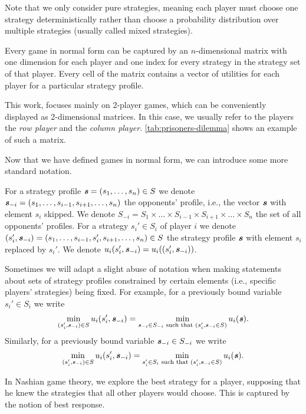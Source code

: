 Note that we only consider pure strategies, meaning each player must choose one strategy deterministically rather than choose a probability distribution over multiple strategies (usually called mixed strategies).

Every game in normal form can be captured by an $n$-dimensional matrix with one dimension for each player and one index for every strategy in the strategy set of that player.
Every cell of the matrix contains a vector of utilities for each player for a particular strategy profile.

This work, focuses mainly on 2-player games, which can be conveniently displayed as 2-dimensional matrices.
In this case, we usually refer to the players the \textit{row player} and the \textit{column player}.
\autoref{tab:prisoners-dilemma} shows an example of such a matrix.

Now that we have defined games in normal form, we can introduce some more standard notation.

\begin{definition}
  For a strategy profile $\boldsymbol{\mathit{s}} = (s_1, \dots, s_n) \in S$ we denote $\boldsymbol{\mathit{s}}_{-i} = (s_1, \dots, s_{i-1}, s_{i+1}, \dots, s_n)$ the opponents' profile, i.e., the vector $\boldsymbol{\mathit{s}}$ with element $s_i$ skipped.
  We denote $S_{-i} = S_1 \times \dots \times S_{i-1} \times S_{i+1} \times \dots \times S_n$ the set of all opponents' profiles.
  For a strategy $s_i' \in S_i$ of player $i$ we denote $(s_i', \boldsymbol{\mathit{s}}_{-i}) = (s_1, \dots, s_{i-1}, s_i', s_{i+1}, \dots, s_n) \in S$ the strategy profile $\boldsymbol{\mathit{s}}$ with element $s_i$ replaced by $s_i'$.
  We denote  $u_i(s_i', \boldsymbol{\mathit{s}}_{-i}) = u_i((s_i', \boldsymbol{\mathit{s}}_{-i}))$.
\end{definition}

Sometimes we will adapt a slight abuse of notation when making statements about sets of strategy profiles constrained by certain elements (i.e., specific players' strategies) being fixed.
For example, for a previously bound variable $s_i' \in S_i$ we write
\[
  \min_{(s_i', \boldsymbol{\mathit{s}}_{-i}) \in S}u_i(s_i', \boldsymbol{\mathit{s}}_{-i}) = \min_{\boldsymbol{\mathit{s}}_{-i} \in S_{-i} \text{ such that } (s_i', \boldsymbol{\mathit{s}}_{-i} \in S)}u_i(\boldsymbol{\mathit{s}}).
\]
Similarly, for a previously bound variable $\boldsymbol{\mathit{s}}_{-i} \in S_{-i}$ we write
\[
  \min_{(s_i', \boldsymbol{\mathit{s}}_{-i}) \in S}u_i(s_i', \boldsymbol{\mathit{s}}_{-i}) = \min_{s_i' \in S_{i} \text{ such that } (s_i', \boldsymbol{\mathit{s}}_{-i} \in S)}u_i(\boldsymbol{\mathit{s}}).
\]

In Nashian game theory, we explore the best strategy for a player, supposing that he knew the strategies that all other players would choose.
This is captured by the notion of best response.

